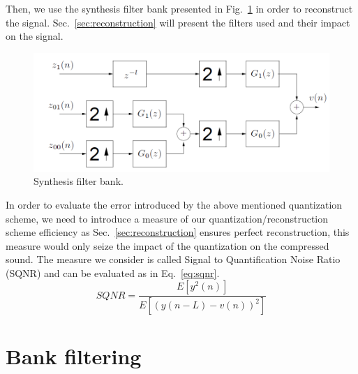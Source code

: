 \documentclass[a4paper,twocolumn]{article}
\begin{document}
Then, we use the synthesis filter bank presented in Fig.~\ref{fig:synthesis} in order to reconstruct the signal. Sec.~\ref{sec:reconstruction} will present the filters used and their impact on the signal.

\begin{figure}[!ht]
  \begin{center}
    \includegraphics[width=0.83\columnwidth]{synthesys.PNG}
  \end{center}
  \caption{Synthesis filter bank.}
  \label{fig:synthesis}
\end{figure}

In order to evaluate the error introduced by the above mentioned quantization scheme, we need to introduce a measure of our quantization/reconstruction scheme efficiency as Sec.~\ref{sec:reconstruction} ensures perfect reconstruction, this measure would only seize the impact of the quantization on the compressed sound.
The measure we consider is called Signal to Quantification Noise Ratio (SQNR) and can be evaluated as in Eq.~\ref{eq:sqnr}. 
\begin{equation}
  \label{eq:sqnr}
  SQNR= \frac{E[y^2(n)]}{E[\left(y(n-L)-v(n)\right)^2]}
\end{equation}




\section{Bank filtering}
\label{sec:filtering}
\end{document}
